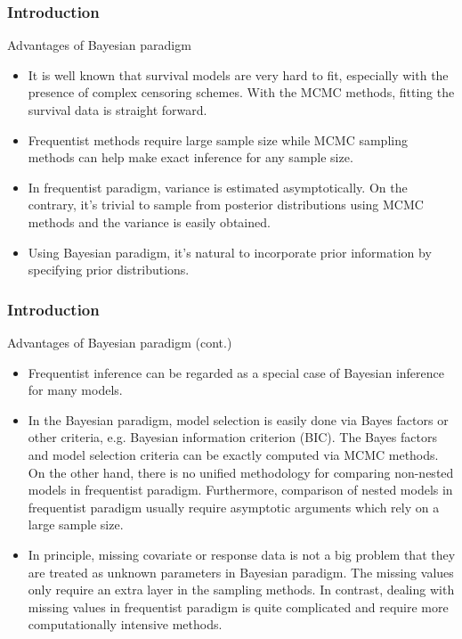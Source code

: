 \documentclass{beamer}
\begin{document}
	\begin{frame}
		\frametitle{Introduction}
		Advantages of Bayesian paradigm
		\begin{itemize}
			\item It is well known that survival models are very hard to fit, especially with the presence of complex censoring schemes. With the MCMC methods, fitting the survival data is straight forward.
			\item Frequentist methods require large sample size while MCMC sampling methods can help make exact inference for any sample size.
			\item  In frequentist paradigm, variance is estimated asymptotically. On the contrary, it's trivial to sample from posterior distributions using MCMC methods and the variance is easily obtained.
			\item Using Bayesian paradigm, it's natural to incorporate prior information by specifying prior distributions.
		\end{itemize}
	\end{frame}
	
	\begin{frame}
		\frametitle{Introduction}
		Advantages of Bayesian paradigm (cont.)
		\begin{itemize}
			\item Frequentist inference can be regarded as a special case of Bayesian inference for many models. 
			\item In the Bayesian paradigm, model selection is easily done via Bayes factors or other criteria, e.g. Bayesian information criterion (BIC). The Bayes factors and model selection criteria can be exactly computed via MCMC methods. On the other hand, there is no unified methodology for comparing non-nested models in frequentist paradigm. Furthermore, comparison of nested models in frequentist paradigm usually require asymptotic arguments which rely on a large sample size.
			\item  In principle, missing covariate or response data is not a big problem that they are treated as unknown parameters in Bayesian paradigm. The missing values only require an extra layer in the sampling methods. In contrast, dealing with missing values in frequentist paradigm is quite complicated and require more computationally intensive methods.
		\end{itemize}
	\end{frame}
	
\end{document}
